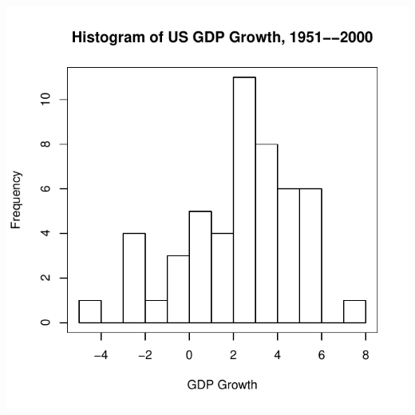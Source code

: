 \documentclass[pdflatex,landscape,titlepage]{foils}
\begin{document}
\begin{center}
\color{black}
\includegraphics[width=7.5 in]{gdphist_all}
\color{white}
\end{center}
\end{document}
